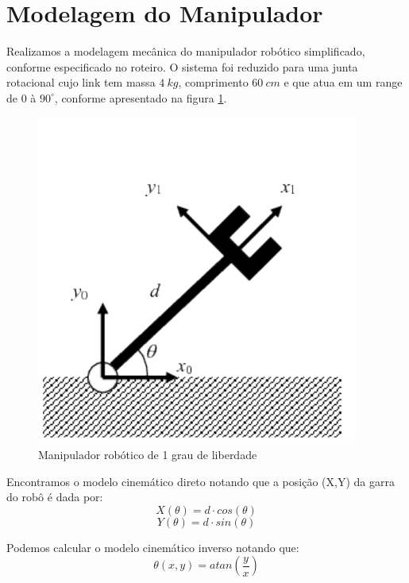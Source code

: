 \documentclass{article}
\begin{document}
\section{Modelagem do Manipulador}
Realizamos a modelagem mecânica do manipulador robótico simplificado, conforme especificado no roteiro. O sistema foi reduzido para uma junta rotacional cujo link tem massa $4\ kg$, comprimento $60\ cm$ e que atua em um range de $0$ à $90^\circ$, conforme apresentado na figura \ref{fig:robo}.

\begin{figure}[H]
	\centering
	\includegraphics[width=0.5\linewidth]{robo}
	\caption{Manipulador robótico de 1 grau de liberdade}
	\label{fig:robo}
\end{figure}

Encontramos o modelo cinemático direto notando que a posição (X,Y) da garra do robô é dada por:
\begin{equation}
	X(\theta) = d\cdot cos(\theta)
\end{equation}
\begin{equation}
	Y(\theta) = d\cdot sin(\theta)
\end{equation}

Podemos calcular o modelo cinemático inverso notando que:
\begin{equation}
	\theta(x,y) = atan(\frac{y}{x})
\end{equation}
\end{document}
